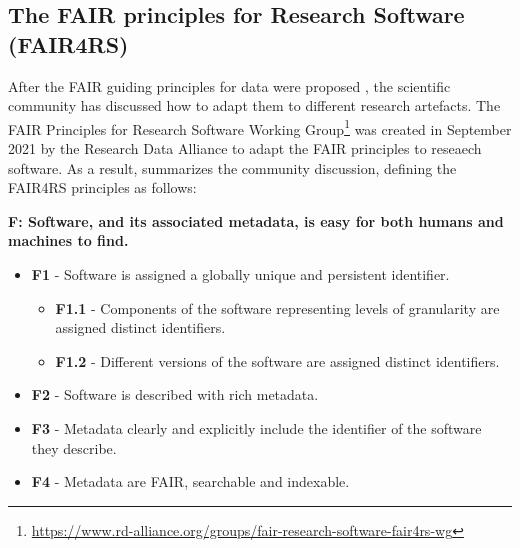 
\subsection{The FAIR principles for Research Software (FAIR4RS)}\label{subsec:fair4rs}


After the FAIR guiding principles for data were proposed \cite{wilkinson_fair_2016}, the scientific community has discussed how to adapt them to different research artefacts. The FAIR Principles for Research Software Working Group\footnote{\url{https://www.rd-alliance.org/groups/fair-research-software-fair4rs-wg}} was created in September 2021 by the Research Data Alliance to adapt the FAIR principles to reseaech software. As a result, \cite{chue_hong_neil_p_2022_6623556} summarizes the community discussion, defining the FAIR4RS principles as follows:


\textbf{F: Software, and its associated metadata, is easy for both humans and machines to find.}

\begin{itemize}
    \item \textbf{F1} - Software is assigned a globally unique and persistent identifier.
    \begin{itemize}
        \item \textbf{F1.1} - Components of the software representing levels of granularity are assigned distinct identifiers.
        \item \textbf{F1.2} - Different versions of the software are assigned distinct identifiers.
    \end{itemize}

    \item \textbf{F2} - Software is described with rich metadata.
    \item \textbf{F3} - Metadata clearly and explicitly include the identifier of the software they describe.
    \item \textbf{F4} - Metadata are FAIR, searchable and indexable.
\end{itemize}


